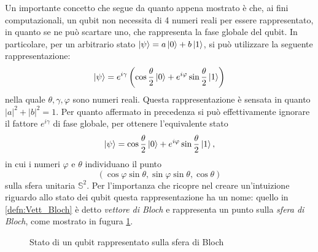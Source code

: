 Un importante concetto che segue da quanto appena mostrato è che, ai fini computazionali, un qubit non necessita di 4 numeri reali per essere rappresentato, in quanto se ne può scartare uno, che rappresenta la fase globale del qubit.
In particolare, per un arbitrario stato $\ket{\psi} = a \ket{0} + b \ket{1}$, si può utilizzare la seguente rappresentazione:
\begin{equation}\label{eqn:Rappr_Bloch}
 \ket{\psi} = e^{i\gamma} \left( \cos \frac{\theta}{2} \ket{0} + e^{i\varphi}\sin \frac{\theta}{2} \ket{1} \right)
\end{equation}
nella quale $\theta, \gamma, \varphi$ sono numeri reali.
Questa rappresentazione è sensata in quanto $|a|^2 + |b|^2 = 1$.
Per quanto affermato in precedenza si può effettivamente ignorare il fattore $e^{i\gamma}$ di fase globale, per ottenere l'equivalente stato
\begin{equation}\label{defn:Rappr_Bloch}
 \ket{\psi} = \cos \frac{\theta}{2} \ket{0} + e^{i\varphi}\sin \frac{\theta}{2} \ket{1},
\end{equation}
in cui i numeri $\varphi$ e $\theta$ individuano il punto 
\begin{equation}\label{defn:Vett_Bloch}
 \left( \cos \varphi \sin \theta, \sin \varphi \sin \theta, \cos \theta \right)
\end{equation}
sulla sfera unitaria $\mathbb{S}^2$. 
Per l'importanza che ricopre nel creare un'intuizione riguardo allo stato dei qubit questa rappresentazione ha un nome: quello in \eqref{defn:Vett_Bloch} è detto \textit{vettore di Bloch} e rappresenta un punto sulla \textit{sfera di Bloch}, come mostrato in fugura \ref{fig:Bloch_sphere}.

\begin{figure}[h]
 \centering
 \caption{Stato di un qubit rappresentato sulla sfera di Bloch}\label{fig:Bloch_sphere}
\end{figure}


